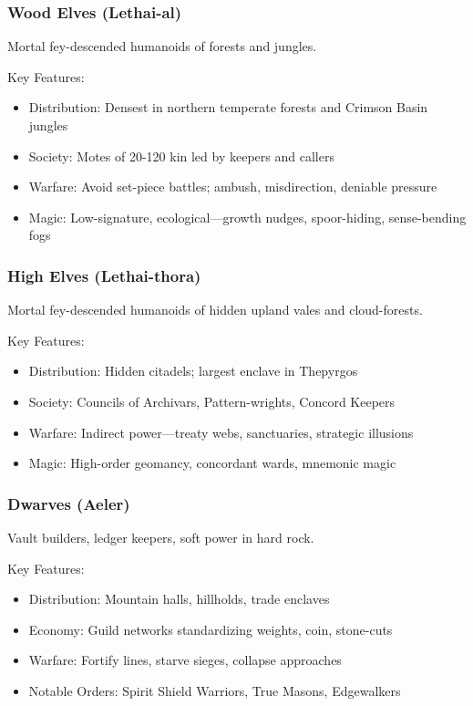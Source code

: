 \subsubsection{Wood Elves (Lethai-al)}
\label{sec:woodelves}

Mortal fey-descended humanoids of forests and jungles.

Key Features:
\begin{itemize}
    \item Distribution: Densest in northern temperate forests and Crimson Basin jungles
    \item Society: Motes of 20-120 kin led by keepers and callers
    \item Warfare: Avoid set-piece battles; ambush, misdirection, deniable pressure
    \item Magic: Low-signature, ecological---growth nudges, spoor-hiding, sense-bending fogs
\end{itemize}

\subsubsection{High Elves (Lethai-thora)}
\label{sec:highelves}

Mortal fey-descended humanoids of hidden upland vales and cloud-forests.

Key Features:
\begin{itemize}
    \item Distribution: Hidden citadels; largest enclave in Thepyrgos
    \item Society: Councils of Archivars, Pattern-wrights, Concord Keepers
    \item Warfare: Indirect power---treaty webs, sanctuaries, strategic illusions
    \item Magic: High-order geomancy, concordant wards, mnemonic magic
\end{itemize}

\subsubsection{Dwarves (Aeler)}
\label{sec:dwarves}

Vault builders, ledger keepers, soft power in hard rock.

Key Features:
\begin{itemize}
    \item Distribution: Mountain halls, hillholds, trade enclaves
    \item Economy: Guild networks standardizing weights, coin, stone-cuts
    \item Warfare: Fortify lines, starve sieges, collapse approaches
    \item Notable Orders: Spirit Shield Warriors, True Masons, Edgewalkers
\end{itemize}

